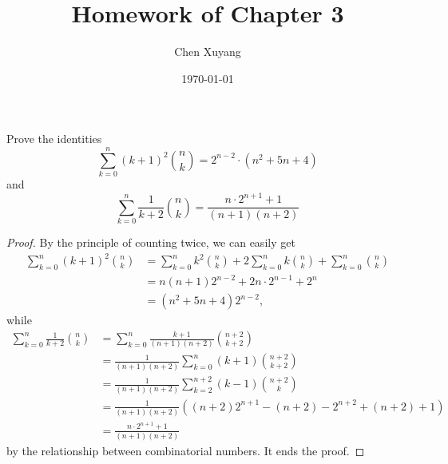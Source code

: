 \documentclass{assignment}[2019/10/15]
\title{Homework of Chapter 3}
\author{Chen Xuyang}
\date{\today}
\institute{School of Mathematical Science}
\newcommand{\lr}[3]{\left#1#3\right#2}
\begin{document}
    \maketitle
    \begin{problem}
        Prove the identities
        \begin{equation}
            \sum_{k=0}^n(k+1)^2\binom{n}{k}=2^{n-2}\cdot(n^2+5n+4)
        \end{equation}
        and
        \begin{equation}
            \sum_{k=0}^n\frac{1}{k+2}\binom{n}{k}=\frac{n\cdot 2^{n+1}+1}{(n+1)(n+2)}
        \end{equation}
    \end{problem}
    \begin{proof}
        By the principle of counting twice, we can easily get
        \begin{equation}
            \begin{aligned}
                \sum_{k=0}^n(k+1)^2\binom{n}{k}
                &=\sum_{k=0}^n k^2\binom{n}{k}
                +2\sum_{k=0}^n k\binom{n}{k}
                +\sum_{k=0}^n\binom{n}{k}\\
                &=n(n+1)2^{n-2}+2n\cdot 2^{n-1}+2^n\\
                &=(n^2+5n+4)2^{n-2},
            \end{aligned}
        \end{equation}
        while
        \begin{equation}
            \begin{aligned}
                \sum_{k=0}^n\frac{1}{k+2}\binom{n}{k}
                &= \sum_{k=0}^n\frac{k+1}{(n+1)(n+2)}\binom{n+2}{k+2}\\
                &= \frac{1}{(n+1)(n+2)}\sum_{k=0}^n(k+1)\binom{n+2}{k+2}\\
                &= \frac{1}{(n+1)(n+2)}\sum_{k=2}^{n+2}(k-1)\binom{n+2}{k}\\
                &= \frac{1}{(n+1)(n+2)}\lr(){(n+2)2^{n+1}-(n+2)-2^{n+2}+(n+2)+1}\\
                &= \frac{n\cdot 2^{n+1}+1}{(n+1)(n+2)}
            \end{aligned}
        \end{equation}
        by the relationship between combinatorial numbers. It ends the proof.
    \end{proof}
    \clearpage
\end{document}
